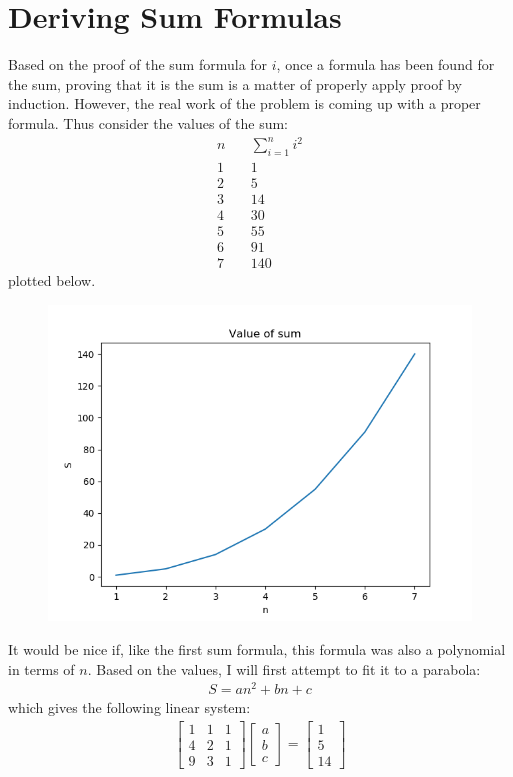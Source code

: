 \documentclass{article}
\begin{document}
\section*{Deriving Sum Formulas}
Based on the proof of the sum formula for $i$, once a formula has been found for the sum, proving that it is the sum is a matter of properly apply proof by induction. However, the real work of the problem is coming up with a proper formula. Thus consider the values of the sum:
\begin{align*}
n &\quad \sum_{i = 1}^{n}i^{2}\\
1 &\quad 1\\
2 &\quad 5\\
3 &\quad 14\\
4 &\quad 30\\
5 &\quad 55\\
6 &\quad 91\\
7 &\quad 140
\end{align*}
plotted below.
\newpage
\begin{figure}
	\includegraphics{Figure_1.png}
\end{figure}
It would be nice if, like the first sum formula, this formula was also a polynomial in terms of $n$. Based on the values, I will first attempt to fit it to a parabola:
\begin{gather*}
	S = an^{2} + bn + c
\end{gather*}
which gives the following linear system:
\begin{gather*}
	\begin{bmatrix}
		1 & 1 & 1\\
		4 & 2 & 1\\
		9 & 3 & 1
	\end{bmatrix}
	\begin{bmatrix}
		a\\
		b\\
		c
	\end{bmatrix}
	=
	\begin{bmatrix}
		1\\
		5\\
		14
	\end{bmatrix}
\end{gather*}
\end{document}
